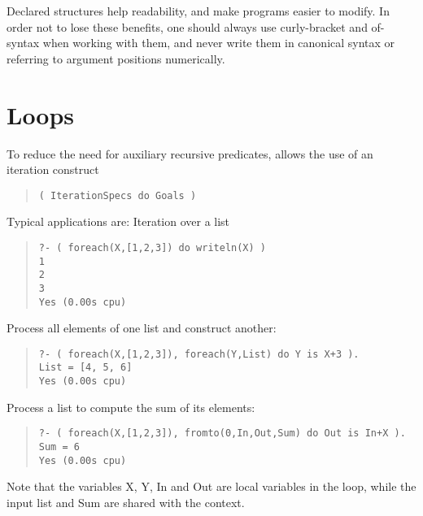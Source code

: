 Declared structures help readability, and make programs easier to modify.
In order not to lose these benefits, one should always use curly-bracket and
of-syntax when working with them, and never write them in canonical
syntax or referring to argument positions numerically.



\section{Loops}
\label{sec:loops}
To reduce the need for auxiliary recursive predicates, \eclipse{} allows
the use of an iteration construct
\begin{quote}\begin{verbatim}
( IterationSpecs do Goals )
\end{verbatim}\end{quote}
Typical applications are: Iteration over a list
\begin{quote}\begin{verbatim}
?- ( foreach(X,[1,2,3]) do writeln(X) )
1
2
3
Yes (0.00s cpu)
\end{verbatim}\end{quote}
Process all elements of one list and construct another:
\begin{quote}\begin{verbatim}
?- ( foreach(X,[1,2,3]), foreach(Y,List) do Y is X+3 ).
List = [4, 5, 6]
Yes (0.00s cpu)
\end{verbatim}\end{quote}
Process a list to compute the sum of its elements:
\begin{quote}\begin{verbatim}
?- ( foreach(X,[1,2,3]), fromto(0,In,Out,Sum) do Out is In+X ).
Sum = 6
Yes (0.00s cpu)
\end{verbatim}\end{quote}
Note that the variables X, Y, In and Out are local variables in the loop,
while the input list and Sum are shared with the context.

